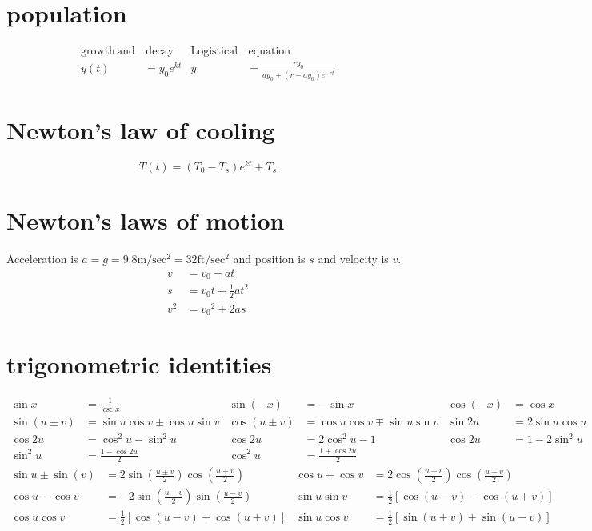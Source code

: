 \documentclass{article}
\begin{document}
\section*{population}
\begin{align*}
\mathrm{growth}\,\mathrm{and}&\,\mathrm{decay}&\mathrm{Logistical}&\,{}\mathrm{equation}\\
y(t)&=y_0 e^{kt}&y&=\frac{ry_0}{ay_0+(r-ay_0)e^{-rt}}
\end{align*}

\section*{Newton's law of cooling}
\[T(t)=\left(T_0-T_s\right)e^{kt}+T_s\]

\section*{Newton's laws of motion}
Acceleration is $a=g=9.8\mathrm{m/sec^2}=32\mathrm{ft/sec^2}$ and position is $s$ and velocity is $v$.
\begin{align*}
	v&=v_0+at\\
	s&=v_0t+\frac{1}{2}at^2\\
	v^2&={v_0}^2+2as
\end{align*}

\section*{trigonometric identities}
\begin{align*}
	\sin x&=\frac{1}{\csc x} & \sin(-x)&=-\sin x & \cos(-x)&=\cos x\\
	\sin(u\pm v)&=\sin u \cos v \pm \cos u \sin v & \cos(u \pm v)&=\cos u \cos v \mp \sin u \sin v & \sin 2u&=2\sin u \cos u\\
	\cos 2u&=\cos^2 u - \sin^2 u & \cos 2u&=2\cos^2 u - 1 & \cos 2u&=1 - 2\sin^2 u\\
	\sin^2 u&=\frac{1-\cos 2u}{2} & \cos^2 u&=\frac{1+\cos 2u}{2}
\end{align*}
\begin{align*}
	\sin u \pm \sin(v)&=2\sin\left(\frac{u\pm v}{2}\right)\cos\left(\frac{u \mp v}{2}\right) & \cos u + \cos v&=2\cos\left(\frac{u + v}{2}\right)\cos\left(\frac{u - v}{2}\right)\\
	\cos u - \cos v&=-2\sin\left(\frac{u + v}{2}\right)\sin\left(\frac{u - v}{2}\right) & \sin u\sin v&=\frac{1}{2}[\cos(u-v)-\cos(u+v)]\\
	\cos u\cos v&=\frac{1}{2}[\cos(u-v)+\cos(u+v)] & \sin u\cos v&=\frac{1}{2}[\sin(u+v)+\sin(u-v)]
\end{align*}
\end{document}
